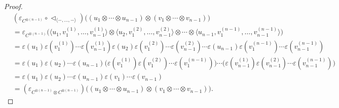 \documentclass[10pt,a4paper]{amsart}
\begin{document}
\begin{proof}
\begin{align*}
         &(\varepsilon_{C^{\otimes (n-1)}} \circ \triangleleft_{\langle -, \ldots , - \rangle }) \big(   (u_1 \otimes \cdots \otimes u_{n-1}) \otimes (v_1 \otimes \cdots \otimes v_{n-1})   \big) \\
         &= \varepsilon_{C^{\otimes (n-1)}} \big(   \langle u_1, v_1^{(1)}, \ldots, v_{n-1}^{(1)} \rangle \otimes  \langle u_2, v_1^{(2)}, \ldots, v_{n-1}^{(2)} \rangle \otimes \cdots \otimes  \langle u_{n-1}, v_1^{(n-1)}, \ldots, v_{n-1}^{(n-1)} \rangle   \big) \\
         &= \varepsilon (u_1) \varepsilon (v_1^{(1)}) \cdots \varepsilon (v_{n-1}^{(1)}) 
         \varepsilon (u_2) \varepsilon (v_1^{(2)}) \cdots \varepsilon (v_{n-1}^{(2)}) \cdots \varepsilon (u_{n-1}) \varepsilon (v_1^{(n-1)}) \cdots \varepsilon (v_{n-1}^{(n-1)}) \\
         &= \varepsilon (u_1) \varepsilon (u_2) \cdots \varepsilon (u_{n-1}) \big(  \varepsilon (v_1^{(1)}) \varepsilon (v_1^{(2)}) \cdots \varepsilon (v_1^{(n-1)})    \big) \cdots \big(  \varepsilon (v_{n-1}^{(1)}) \varepsilon (v_{n-1}^{(2)}) \cdots \varepsilon (v_{n-1}^{(n-1)})   \big) \\
         &= \varepsilon (u_1) \varepsilon (u_2) \cdots \varepsilon (u_{n-1}) \varepsilon (v_1) \cdots \varepsilon (v_{n-1}) \\
         &= (\varepsilon_{C^{\otimes (n-1)} \otimes C^{\otimes (n-1)}}) \big(   (u_1 \otimes \cdots \otimes u_{n-1}) \otimes (v_1 \otimes \cdots \otimes v_{n-1})   \big).
     \end{align*}

     \medskip


\end{proof}
\end{document}

